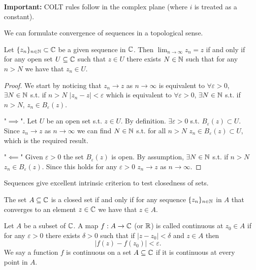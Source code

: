 \documentclass[10pt, a4paper]{article}
\begin{document}
\textbf{Important:}
COLT rules follow in the complex plane
(where $i$ is treated as a constant).

We can formulate convergence of sequences in a topological sense.

\begin{lemma}
    Let $\{z_n\}_{n \in \mathbb{N}} \subset \mathbb{C}$ be a given sequence in $\mathbb{C}$.
    Then $\lim_{n \to \infty}z_n = z$ if and only if for any open set $U \subseteq \mathbb{C}$ such that $z \in U$ there exists $N \in \mathbb{N}$ such that for any $n > N$ we have that $z_n \in U$.

    \begin{proof}
        We start by noticing that $z_n \to z$ as $n \to \infty$ is equivalent to $\forall \varepsilon > 0$,
        $\exists N \in \mathbb{N}$ s.t. if $n > N$ $|z_n - z| < \varepsilon$ which is equivalent to $\forall \varepsilon > 0$,
        $\exists N \in \mathbb{N}$ s.t. if $n > N$,
        $z_n \in B_{\varepsilon}(z)$.

        "$\implies$".
        Let $U$ be an open set s.t. $z \in U$.
        By definition.
        $\exists \varepsilon > 0$ s.t. $B_{\varepsilon}(z) \subset U$.
        Since $z_n \to z$ as $n \to \infty$ we can find $N \in \mathbb{N}$ s.t. for all $n > N$ $z_n \in B_{\varepsilon}(z) \subset U$,
        which is the required result.

        "$\impliedby$"
        Given $\varepsilon > 0$ the set $B_{\varepsilon}(z)$ is open.
        By assumption,
        $\exists N \in \mathbb{N}$ s.t. if $n > N$ $z_n \in B_{\varepsilon}(z)$.
        Since this holds for any $\varepsilon > 0$ $z_n \to z$ as $n \to \infty$.
    \end{proof}
\end{lemma}

Sequences give excellent intrinsic criterion to test closedness of sets.

\begin{lemma}
    The set $A \subseteq \mathbb{C}$ is a closed set if and only if for any sequence $\{z_n\}_{n \in \mathbb{N}}$ in $A$ that converges to an element $z \in \mathbb{C}$ we have that $z \in A$.
\end{lemma}

\begin{definition}[Continuity]
    Let $A$ be a subset of $\mathbb{C}$.
    A map $f : A \to \mathbb{C}$
    (or $\mathbb{R}$)
    is called continuous at $z_0 \in A$ if for any $\varepsilon > 0$ there exists $\delta > 0$ such that if $|z - z_0| < \delta$ and $z \in A$ then
    \[
    |f(z) - f(z_0)| < \varepsilon.
    \]
    We say a function $f$ is continuous on a set $A \subseteq \mathbb{C}$ if it is continuous at every point in $A$.
\end{definition}
\end{document}
